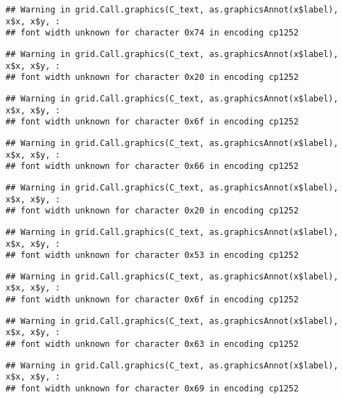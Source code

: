 \documentclass[
]{article}
\begin{document}
\begin{verbatim}
## Warning in grid.Call.graphics(C_text, as.graphicsAnnot(x$label), x$x, x$y, :
## font width unknown for character 0x74 in encoding cp1252
\end{verbatim}

\begin{verbatim}
## Warning in grid.Call.graphics(C_text, as.graphicsAnnot(x$label), x$x, x$y, :
## font width unknown for character 0x20 in encoding cp1252
\end{verbatim}

\begin{verbatim}
## Warning in grid.Call.graphics(C_text, as.graphicsAnnot(x$label), x$x, x$y, :
## font width unknown for character 0x6f in encoding cp1252
\end{verbatim}

\begin{verbatim}
## Warning in grid.Call.graphics(C_text, as.graphicsAnnot(x$label), x$x, x$y, :
## font width unknown for character 0x66 in encoding cp1252
\end{verbatim}

\begin{verbatim}
## Warning in grid.Call.graphics(C_text, as.graphicsAnnot(x$label), x$x, x$y, :
## font width unknown for character 0x20 in encoding cp1252
\end{verbatim}

\begin{verbatim}
## Warning in grid.Call.graphics(C_text, as.graphicsAnnot(x$label), x$x, x$y, :
## font width unknown for character 0x53 in encoding cp1252
\end{verbatim}

\begin{verbatim}
## Warning in grid.Call.graphics(C_text, as.graphicsAnnot(x$label), x$x, x$y, :
## font width unknown for character 0x6f in encoding cp1252
\end{verbatim}

\begin{verbatim}
## Warning in grid.Call.graphics(C_text, as.graphicsAnnot(x$label), x$x, x$y, :
## font width unknown for character 0x63 in encoding cp1252
\end{verbatim}

\begin{verbatim}
## Warning in grid.Call.graphics(C_text, as.graphicsAnnot(x$label), x$x, x$y, :
## font width unknown for character 0x69 in encoding cp1252
\end{verbatim}
\end{document}
